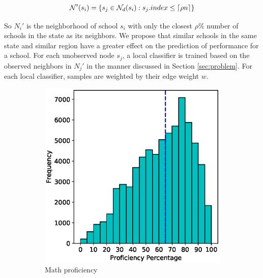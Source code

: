 \begin{displaymath}
\mathcal{N}'(s_i) = \left\{ s_j \in \mathcal{N}_d(s_i) : s_j.index \leq \lceil\rho n\rceil \right\}
\end{displaymath}

So $N_i'$ is the neighborhood of school $s_i$ with only the closest $\rho\%$ number of schools in the state as its neighbors. We propose that similar schools in the same state and similar region have a greater effect on the prediction of performance for a school. For each unobserved node $s_j$, a local classifier is trained based on the observed neighbors in $N_j'$ in the manner discussed in Section \ref{sec:problem}. For each local classifier, samples are weighted by their edge weight $w$.

\begin{figure}
	\begin{subfigure}{.2325\textwidth}
		\includegraphics[width=\linewidth]{images/prof_math}
		\caption{Math proficiency}
	\end{subfigure}
	\hspace{\fill}  %
	\begin{subfigure}{.2325\textwidth}

\end{subfigure}
\end{figure}
